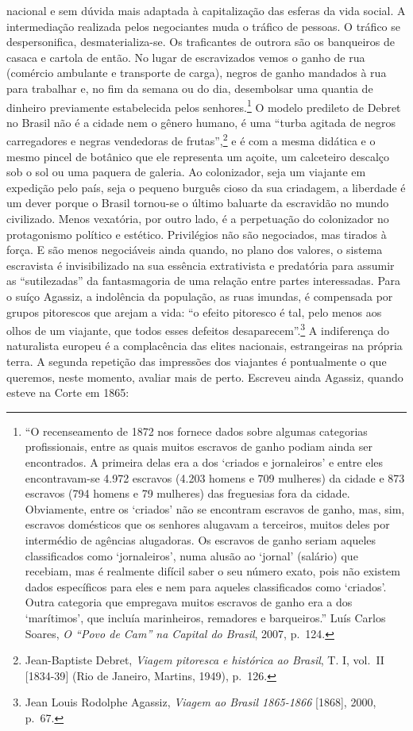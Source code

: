 nacional e sem dúvida mais adaptada à capitalização das esferas da vida
social. A intermediação realizada pelos negociantes muda o tráfico de
pessoas. O tráfico se despersonifica, desmaterializa-se. Os traficantes
de outrora são os banqueiros de casaca e cartola de então. No lugar de
escravizados vemos o ganho de rua (comércio ambulante e transporte de
carga), negros de ganho mandados à rua para trabalhar e, no fim da
semana ou do dia, desembolsar uma quantia de dinheiro previamente
estabelecida pelos senhores.\footnote{``O recenseamento de 1872 nos
  fornece dados sobre algumas categorias profissionais, entre as quais
  muitos escravos de ganho podiam ainda ser encontrados. A primeira
  delas era a dos `criados e jornaleiros' e entre eles encontravam-se
  4.972 escravos (4.203 homens e 709 mulheres) da cidade e 873 escravos
  (794 homens e 79 mulheres) das freguesias fora da cidade. Obviamente,
  entre os `criados' não se encontram escravos de ganho, mas, sim,
  escravos domésticos que os senhores alugavam a terceiros, muitos deles
  por intermédio de agências alugadoras. Os escravos de ganho seriam
  aqueles classificados como `jornaleiros', numa alusão ao `jornal'
  (salário) que recebiam, mas é realmente difícil saber o seu número
  exato, pois não existem dados específicos para eles e nem para aqueles
  classificados como `criados'. Outra categoria que empregava muitos
  escravos de ganho era a dos `marítimos', que incluía marinheiros,
  remadores e barqueiros.'' Luís Carlos Soares, \textit{O ``Povo de Cam''
  na Capital do Brasil}, 2007, p.~124.} O modelo predileto de Debret no
Brasil não é a cidade nem o gênero humano, é uma ``turba agitada de
negros carregadores e negras vendedoras de frutas'',\footnote{Jean-Baptiste
  Debret, \textit{Viagem pitoresca e histórica ao Brasil}, T. I, vol.~II
  {[}1834-39{]} (Rio de Janeiro, Martins, 1949), p.~126.} e é com a
mesma didática e o mesmo pincel de botânico que ele representa um
açoite, um calceteiro descalço sob o sol ou uma paquera de galeria. Ao
colonizador, seja um viajante em expedição pelo país, seja o pequeno
burguês cioso da sua criadagem, a liberdade é um dever porque o Brasil
tornou-se o último baluarte da escravidão no mundo civilizado. Menos
vexatória, por outro lado, é a perpetuação do colonizador no
protagonismo político e estético. Privilégios não são negociados, mas
tirados à força. E são menos negociáveis ainda quando, no plano dos
valores, o sistema escravista é invisibilizado na sua essência
extrativista e predatória para assumir as ``sutilezadas'' da
fantasmagoria de uma relação entre partes interessadas. Para o suíço
Agassiz, a indolência da população, as ruas imundas, é compensada por
grupos pitorescos que arejam a vida: ``o efeito pitoresco é tal, pelo
menos aos olhos de um viajante, que todos esses defeitos
desaparecem''.\footnote{Jean Louis Rodolphe Agassiz, \textit{Viagem ao
  Brasil 1865-1866} {[}1868{]}, 2000, p.~67.} A indiferença do
naturalista europeu é a complacência das elites nacionais, estrangeiras
na própria terra. A segunda repetição das impressões dos viajantes é
pontualmente o que queremos, neste momento, avaliar mais de perto.
Escreveu ainda Agassiz, quando esteve na Corte em 1865:

